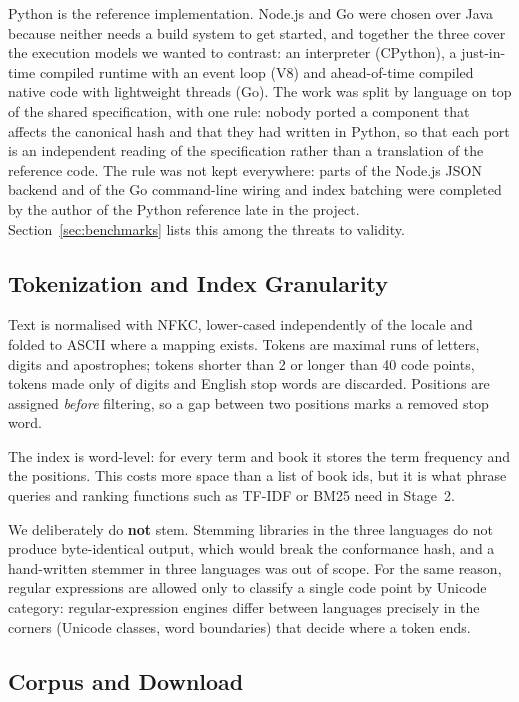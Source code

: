 \documentclass[12pt,a4paper]{article}
\begin{document}
	Python is the reference implementation. Node.js and Go were chosen over Java because
	neither needs a build system to get started, and together the three cover the execution
	models we wanted to contrast: an interpreter (CPython), a just-in-time compiled runtime
	with an event loop (V8) and ahead-of-time compiled native code with lightweight threads
	(Go). The work was split by language on top of the shared specification, with one rule:
	nobody ported a component that affects the canonical hash and that they had written in
	Python, so that each port is an independent reading of the specification rather than a
	translation of the reference code. The rule was not kept everywhere: parts of the Node.js
	JSON backend and of the Go command-line wiring and index batching were completed by the
	author of the Python reference late in the project. Section~\ref{sec:benchmarks}
	lists this among the threats to validity.

	\subsection{Tokenization and Index Granularity}

	Text is normalised with NFKC, lower-cased independently of the locale and folded to
	ASCII where a mapping exists. Tokens are maximal runs of letters, digits and apostrophes;
	tokens shorter than 2 or longer than 40 code points, tokens made only of digits and
	English stop words are discarded. Positions are assigned \emph{before} filtering, so a
	gap between two positions marks a removed stop word.

	The index is word-level: for every term and book it stores the term frequency and the
	positions. This costs more space than a list of book ids, but it is what phrase queries
	and ranking functions such as TF-IDF or BM25 need in Stage~2.

	We deliberately do \textbf{not} stem. Stemming libraries in the three languages do not
	produce byte-identical output, which would break the conformance hash, and a
	hand-written stemmer in three languages was out of scope. For the same reason, regular
	expressions are allowed only to classify a single code point by Unicode category:
	regular-expression engines differ between languages precisely in the corners (Unicode
	classes, word boundaries) that decide where a token ends.

	\subsection{Corpus and Download}
\end{document}
